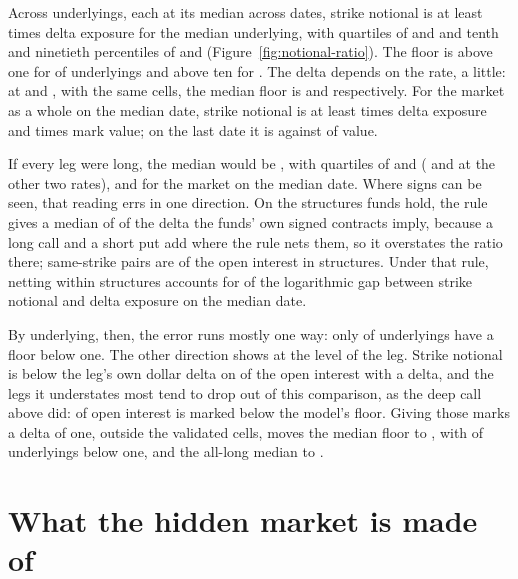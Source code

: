 \documentclass[11pt]{article}
\begin{document}
Across \PosRatioUnderlyings{} underlyings, each at its median across dates, strike notional is
at least \PosGrossMedian{} times delta exposure for the median underlying, with quartiles of
\PosGrossQuarter{} and \PosGrossThreeQuarters{} and tenth and ninetieth percentiles of
\PosGrossTen{} and \PosGrossNinety{} (Figure~\ref{fig:notional-ratio}). The floor is above one
for \PosGrossAboveOne{} of underlyings and above ten for \PosGrossAboveTen{}. The delta depends
on the rate, a little: at \PosRateLow{} and \PosRateHigh{}, with the same cells, the median floor
is \PosGrossRateLow{} and \PosGrossRateHigh{} respectively. For the market as a whole on the median date,
strike notional is at least \PosMarketGross{} times delta exposure and \PosMarketMark{} times
mark value; on the last date it is \PosStrikeLast{} against \ValueEnd{} of value.

If every leg were long, the median would be \PosRatioMedian{}, with quartiles of
\PosRatioQuarter{} and \PosRatioThreeQuarters{} (\PosRatioRateLow{} and \PosRatioRateHigh{}
at the other two rates), and \PosMarketRatio{} for the market on the median date. Where signs
can be seen, that reading errs in one direction. On the \PosSignStructures{} structures funds
hold, the rule gives a median of \PosRuleOverSigned{} of the delta the funds' own signed
contracts imply, because a long call and a short put add where the rule nets them, so it
overstates the ratio there; same-strike pairs are \PosShareSynthetic{} of the open interest in
structures. Under that rule, netting within structures accounts for \PosNettingShare{} of the
logarithmic gap between strike notional and delta exposure on the median date.

By underlying, then, the error runs mostly one way: only \PosGrossBelowOne{} of underlyings
have a floor below one. The other direction shows at the level of the leg. Strike notional is
below the leg's own dollar delta on \PosUnderstated{} of the open interest with a delta, and
the legs it understates most tend to drop out of this comparison, as the deep call above did:
\PosBelowFloor{} of open interest is marked below the model's floor. Giving those marks a delta
of one, outside the validated cells, moves the median floor to \PosFloorGrossMedian{}, with
\PosFloorGrossBelowOne{} of underlyings below one, and the all-long median to
\PosFloorMedian{}.

\section{What the hidden market is made of}
\label{sec:anatomy}
\end{document}
